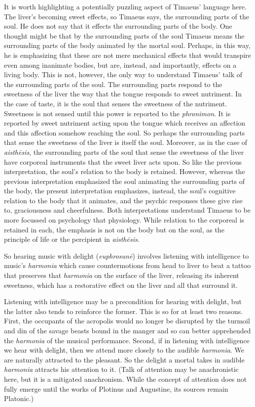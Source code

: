 It is worth highlighting a potentially puzzling aspect of Timaeus' language here. The liver's becoming sweet effects, so Timaeus says, the surrounding parts of the soul. He does not say that it effects the surrounding parts of the body. One thought might be that by the surrounding parts of the soul Timaeus means the surrounding parts of the body animated by the mortal soul. Perhaps, in this way, he is emphasizing that these are not mere mechanical effects that would transpire even among inanimate bodies, but are, instead, and importantly, effects on a living body. This is not, however, the only way to understand Timaeus' talk of the surrounding parts of the soul. The surrounding parts respond to the sweetness of the liver the way that the tongue responds to sweet nutriment. In the case of taste, it is the soul that senses the sweetness of the nutriment. Sweetness is not sensed until this power is reported to the \emph{phronimon}. It is reported by sweet nutriment acting upon the tongue which receives an affection and this affection somehow reaching the soul. So perhaps the surrounding parts that sense the sweetness of the liver is itself the soul. Moreover, as in the case of \emph{aisthēsis}, the surrounding parts of the soul that sense the sweetness of the liver have corporeal instruments that the sweet liver acts upon. So like the previous interpretation, the soul's relation to the body is retained. However, whereas the previous interpretation emphasized the soul animating the surrounding parts of the body, the present interpretation emphasizes, instead, the soul's cognitive relation to the body that it animates, and the psychic responses these give rise to, graciousness and cheerfulness. Both interpretations understand Timaeus to be more focussed on psychology that physiology. While relation to the corporeal is retained in each, the emphasis is not on the body but on the soul, as the principle of life or the percipient in \emph{aisthēsis}.

So hearing music with delight (\emph{euphrosunē}) involves listening with intelligence to music's \emph{harmonia} which cause countermotions from head to liver to beat a tattoo that preserves that \emph{harmonia} on the surface of the liver, releasing its inherent sweetness, which has a restorative effect on the liver and all that surround it. 

Listening with intelligence may be a precondition for hearing with delight, but the latter also tends to reinforce the former. This is so for at least two reasons. First, the occupants of the acropolis would no longer be disrupted by the turmoil and din of the savage beasts bound in the manger and so can better apprehended the \emph{harmonia} of the musical performance. Second, if in listening with intelligence we hear with delight, then we attend more closely to the audible \emph{harmonia}. We are naturally attracted to the pleasant. So the delight a mortal takes in audible \emph{harmonia} attracts his attention to it. (Talk of attention may be anachronistic here, but it is a mitigated anachronism. While the concept of attention does not fully emerge until the works of Plotinus and Augustine, its sources remain Platonic.)

